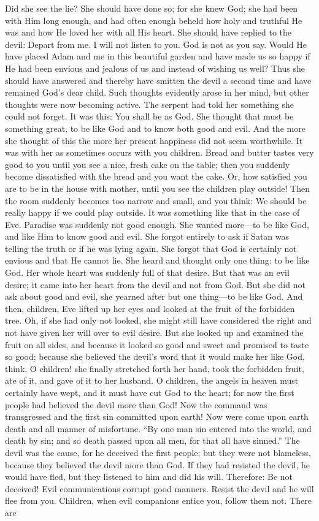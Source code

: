 Did she see the lie? She should have done so; for she knew God; she had been with Him long enough, and had often enough beheld how holy and truthful He was and how He loved her with all His heart. She should have replied to the devil: Depart from me. I will not listen to you. God is not as you say. Would He have placed Adam and me in this beautiful garden and have made us so happy if He had been envious and jealous of us and instead of wishing us well? Thus she should have answered and thereby have smitten the devil a second time and have remained God's dear child. Such thoughts evidently arose in her mind, but other thoughts were now becoming
active. The serpent had told her something she could not forget. It was this: You shall be as God. She thought that must be something great, to be like God and to know both good and evil. And the more she thought of this the more her present happiness did not seem worthwhile. It was with her as sometimes occurs with you children. Bread and butter tastes very good to you until you see a nice, fresh cake on the table; then you suddenly become dissatisfied with the bread and you want the cake. Or, how satisfied you are to be in the house with mother, until you see the children play outside! Then the room suddenly becomes too narrow and small, and you think: We should be really happy if we could play outside. It was something like that in the case of Eve. Paradise was suddenly not good enough. She wanted more—to be like God, and like Him to know good and evil. She forgot entirely to ask if Satan was telling the truth or if he was lying again. She forgot that God is certainly not envious and that He cannot lie. She heard and thought only one thing: to be like God. Her whole heart was suddenly full of that desire. But that was an evil desire; it came into her heart from the devil and not from God. But she did not ask about good and evil, she yearned after but one thing—to be like God. And then, children, Eve lifted up her eyes and looked at the fruit of the forbidden tree. Oh, if she had only not looked, she might still have considered the right and not have given her will over to evil desire. But she looked up and examined the fruit on all sides, and because it looked so good and sweet and promised to taste so good; because she believed the devil’s word that it would make her like God, think, O children! she finally stretched forth her hand, took the forbidden fruit, ate of it, and gave of it to her husband. O children, the angels in heaven must certainly have wept, and it must have cut God to the heart; for now the first people had believed the devil more than God! Now the command was transgressed and the first sin committed upon earth! Now were come upon earth death and all manner of misfortune. “By one man sin entered into the world, and death by sin; and so death passed upon all men, for that all have sinned.” The devil was the cause, for he deceived the first people; but they were not blameless, because they believed the devil more than God. If they had resisted the devil, he would have fled, but they listened to him and did his will. Therefore: Be not deceived! Evil communications corrupt good manners. Resist the devil and he will flee from you. Children, when evil companions entice you, follow them not. There are 